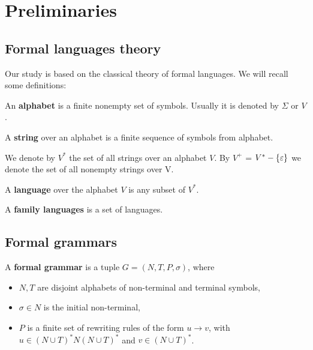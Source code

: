 \chapter{Preliminaries} %
\label{cha:preliminaries}

\section{Formal languages theory} %
\label{sec:formal_languages_theory}

Our study is based on the classical theory of formal languages. We will recall some definitions:

\begin{definition}
An {\bf alphabet} is a finite nonempty set of symbols. Usually it is denoted by $\Sigma$ or $V$.
\end{definition}

\begin{definition}
A {\bf string} over an alphabet is a finite sequence of symbols from alphabet.
\end{definition}

We denote by $V^*$ the set of all strings over an alphabet $V$. By $V^+$ = $V^* - \{\varepsilon\}$ we denote the set of all nonempty strings over V.

\begin{definition}
A {\bf language} over the alphabet $V$ is any subset of $V^*$.
\end{definition}

\begin{definition}
A {\bf family languages} is a set of languages.
\end{definition}


\section{Formal grammars} %
\label{sec:formal_grammars}

\begin{definition}
A {\bf formal grammar} is a tuple $G = (N,T,P,\sigma)$, where
\begin{itemize}
  \item $N, T$ are disjoint alphabets of non-terminal and terminal symbols,
  \item $\sigma\in N$ is the initial non-terminal,
  \item $P$ is a finite set of rewriting rules of the form $u\rightarrow v$, with $u\in (N\cup T)^*N(N\cup T)^*$ and $v\in (N\cup T)^*$.
\end{itemize}
\end{definition}

